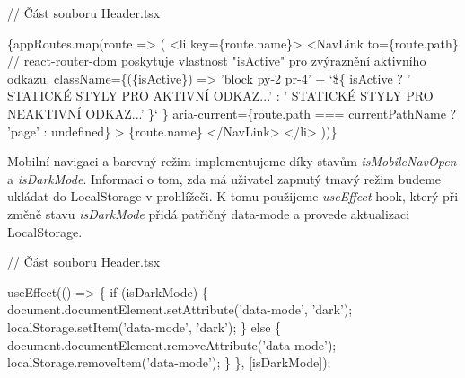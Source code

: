 \begin{prog}
// Část souboru Header.tsx

\{appRoutes.map(route => (
  <li key=\{route.name\}>
    <NavLink
      to=\{route.path\}
      // react-router-dom poskytuje vlastnost "isActive"
        pro zvýraznění aktivního odkazu.
      className=\{(\{isActive\}) =>
        'block py-2 pr-4' +
        `\$\{
          isActive
            ? ' STATICKÉ STYLY PRO AKTIVNÍ ODKAZ...'
            : ' STATICKÉ STYLY PRO NEAKTIVNÍ ODKAZ...'
        \}`
      \}
      aria-current=\{route.path === currentPathName ? 'page' : undefined\}
    >
      \{route.name\}
    </NavLink>
  </li>
))\}
\end{prog}

Mobilní navigaci a barevný režim implementujeme díky stavům \emph{isMobileNavOpen} a \emph{isDarkMode}. Informaci o tom, zda má uživatel zapnutý tmavý režim budeme ukládat do LocalStorage v prohlížeči. 
K tomu použijeme \emph{useEffect} hook, který při změně stavu \emph{isDarkMode} přidá patřičný data-mode a provede aktualizaci LocalStorage.

\begin{prog}
// Část souboru Header.tsx

useEffect(() => \{
  if (isDarkMode) \{
    document.documentElement.setAttribute('data-mode', 'dark');
    localStorage.setItem('data-mode', 'dark');
  \} else \{
    document.documentElement.removeAttribute('data-mode');
    localStorage.removeItem('data-mode');
  \}
\}, [isDarkMode]);
\end{prog}